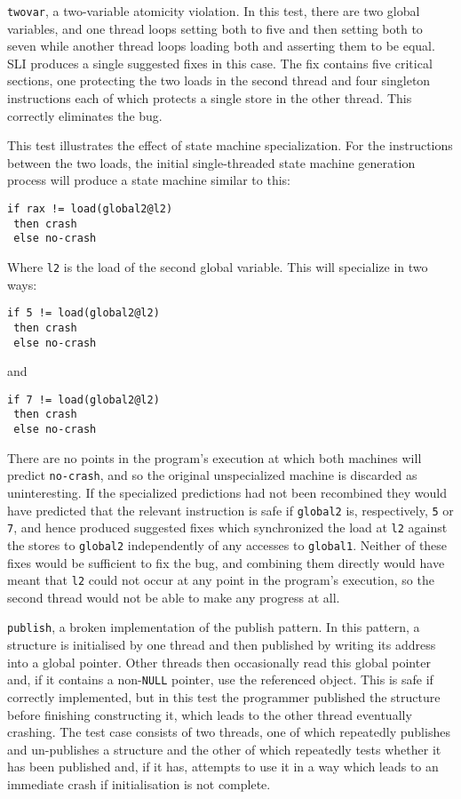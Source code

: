 \documentclass[10pt,twocolumn,preprint,natbib,authoryear]{sigplanconf}
\newcommand{\editorial}[1]{}
\begin{document}
\verb|twovar|, a two-variable atomicity violation.  In this test,
there are two global variables, and one thread loops setting both to
five and then setting both to seven while another thread loops loading
both and asserting them to be equal.  SLI produces a single suggested
fixes in this case.  The fix contains five critical sections, one
protecting the two loads in the second thread and four singleton
instructions each of which protects a single store in the other
thread.  This correctly eliminates the bug.

This test illustrates the effect of state machine specialization.  For
the instructions between the two loads, the initial single-threaded
state machine generation process will produce a state machine similar
to this:

\begin{verbatim}
if rax != load(global2@l2)
 then crash
 else no-crash
\end{verbatim}

Where \verb|l2| is the load of the second global variable.  This
will specialize in two ways:

\begin{verbatim}
if 5 != load(global2@l2)
 then crash
 else no-crash
\end{verbatim}

and

\begin{verbatim}
if 7 != load(global2@l2)
 then crash
 else no-crash
\end{verbatim}

There are no points in the program's execution at which both machines
will predict \verb|no-crash|, and so the original unspecialized
machine is discarded as uninteresting.  If the specialized predictions
had not been recombined they would have predicted that the relevant
instruction is safe if \verb|global2| is, respectively, \verb|5| or
\verb|7|, and hence produced suggested fixes which synchronized the
load at \verb|l2| against the stores to \verb|global2| independently
of any accesses to \verb|global1|.  Neither of these fixes would be
sufficient to fix the bug, and combining them directly would have
meant that \verb|l2| could not occur at any point in the program's
execution, so the second thread would not be able to make any progress
at all.

\verb|publish|, a broken implementation of the publish pattern.  In
this pattern, a structure is initialised by one thread and then
published by writing its address into a global pointer.  Other threads
then occasionally read this global pointer and, if it contains a
non-\verb|NULL| pointer, use the referenced object.\editorial{I'm
  convinced that this is a standard pattern, and that I didn't invent
  the term, but I can't find a reference.}  This is safe if correctly
implemented, but in this test the programmer published the structure
before finishing constructing it, which leads to the other thread
eventually crashing.  The test case consists of two threads, one of
which repeatedly publishes and un-publishes a structure and the other
of which repeatedly tests whether it has been published and, if it
has, attempts to use it in a way which leads to an immediate crash if
initialisation is not complete.
\end{document}
